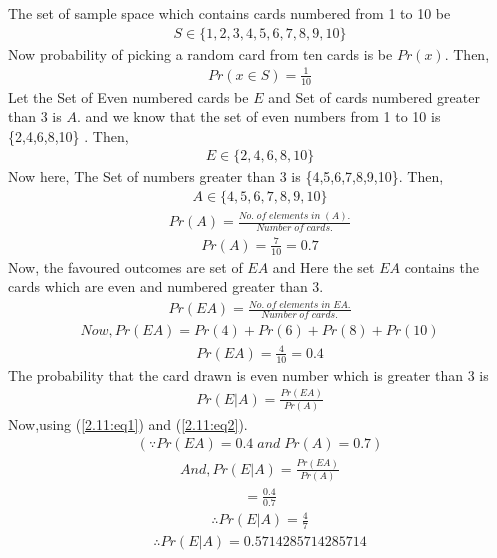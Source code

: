 The set of sample space which contains cards numbered from 1 to 10 be 
\begin{align}
S \in \{1,2,3,4,5,6,7,8,9,10\}
\end{align}
Now probability of picking a random card from ten cards is be $Pr(x)$. Then,
\begin{align}
Pr(x\in S )=\frac{1}{10}
\end{align}
Let the Set of Even numbered cards be $E$ and Set of cards numbered greater than 3 is $A$.
and we know that the set of even numbers from 1 to 10 is \{2,4,6,8,10\} . Then,
\begin{align}
E \in \{2,4,6,8,10\}    
\end{align}
Now here, The Set of numbers greater than 3 
is \{4,5,6,7,8,9,10\}. Then,
\begin{align}
    A \in \{4,5,6,7,8,9,10\}
\end{align}
\begin{align}
    Pr(A)=\frac{No.\; of\; elements\; in\; (A).}{Number\; of\; cards.}
\end{align}
\begin{align}
\label{2.11:eq1}
    Pr(A)=\frac{7}{10}=0.7
\end{align}
Now, the favoured outcomes are set of $EA$ and 
Here the set $EA$ contains the cards which are even and numbered greater than 3.
\begin{align}
    Pr(EA)=\frac{No.\; of\; elements\; in\; E A.}{Number\; of\;cards.}
\end{align}
\begin{align}
   Now , Pr(EA) = Pr(4)+Pr(6)+Pr(8)+Pr(10)
\end{align}
\begin{align}
\label{2.11:eq2}
     Pr(EA) =\frac{4}{10}=0.4 
\end{align}
The probability that the card drawn is even number which is greater than 3 is
\begin{align}
    Pr(E|A)=\frac{Pr(EA)}{Pr(A)}
\end{align}
Now,using (\ref{2.11:eq1}) and (\ref{2.11:eq2}). 
\begin{align}
  (\because Pr(EA)=0.4\; and \; Pr(A)=0.7)  
\end{align}
\begin{align}
And, Pr(E|A)=\frac{Pr(EA)}{Pr(A)}
\end{align}
\begin{align}
=\frac{0.4}{0.7}
\end{align}
\begin{align}
\therefore Pr(E|A)=\frac{4}{7}    
\end{align}
\begin{align}
\therefore Pr(E|A)=0.5714285714285714    
\end{align}